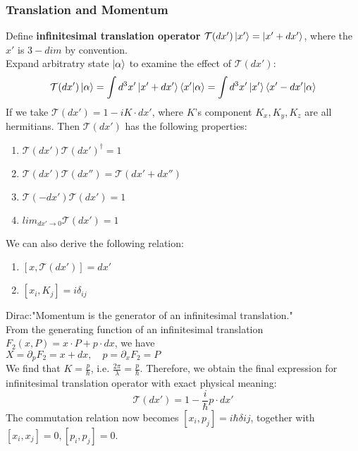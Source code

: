 \documentclass[a4paper, 11pt]{article}
\begin{document}
\subsubsection{Translation and Momentum}
Define \textbf{infinitesimal translation operator} $\mathcal{T}(dx')\ket{x'} = \ket{x' + dx'}$, where the $x'$ is $3-dim$ by convention.\\
\indent Expand arbitratry state $\ket{\alpha}$ to examine the effect of $\mathcal{T}(dx')$:
\begin{equation}
\mathcal{T}(dx')\ket{\alpha} = \int d^3x'\ket{x'+dx'}\braket{x'|\alpha} = \int d^3x'\ket{x'}\braket{x'-dx'|\alpha}
\end{equation}
\indent If we take $\mathcal{T}(dx') =  1 - i K \cdot dx'$, where $K$'s component $K_x, K_y, K_z$ are all hermitians. Then $\mathcal{T}(dx')$ has the following properties:
\begin{enumerate}
	\item $\mathcal{T}(dx') \mathcal{T}(dx')^{\dag} = 1$
	\item $\mathcal{T}(dx')\mathcal{T}(dx'') = \mathcal{T}(dx'+dx'')$
	\item $\mathcal{T}(- dx')\mathcal{T}(dx') = 1$
	\item $lim_{dx' \rightarrow 0} \mathcal{T}(dx') = 1$
\end{enumerate}
\indent We can also derive the following relation: 
\begin{enumerate}
	\item $[x, \mathcal{T}(dx')] = dx'$ 
	\item $[x_i, K_j] = i \delta_{ij} $
\end{enumerate}
\indent Dirac:"Momentum is the generator of an infinitesimal translation."\\
\indent From the generating function of an infinitesimal translation $F_2(x, P) = x \cdot P + p \cdot dx$, we have \\
\indent $X = \partial_{p}F_2 = x +  dx,\quad p = \partial_x F_2 = P$\\
\indent We find that $K = \frac{p}{\hbar}$, i.e. $\frac{2\pi}{\lambda} = \frac{p}{\hbar}$. Therefore, we obtain the final expression for infinitesimal translation operator with exact physical meaning:
\begin{equation}
\mathcal{T}(dx') = 1 - \frac{i}{\hbar}p\cdot dx'
\end{equation}
The commutation relation now becomes $[x_i, p_j] = i\hbar \delta{ij}$, together with $[x_i, x_j] = 0, [p_i, p_j] = 0$.
\end{document}
